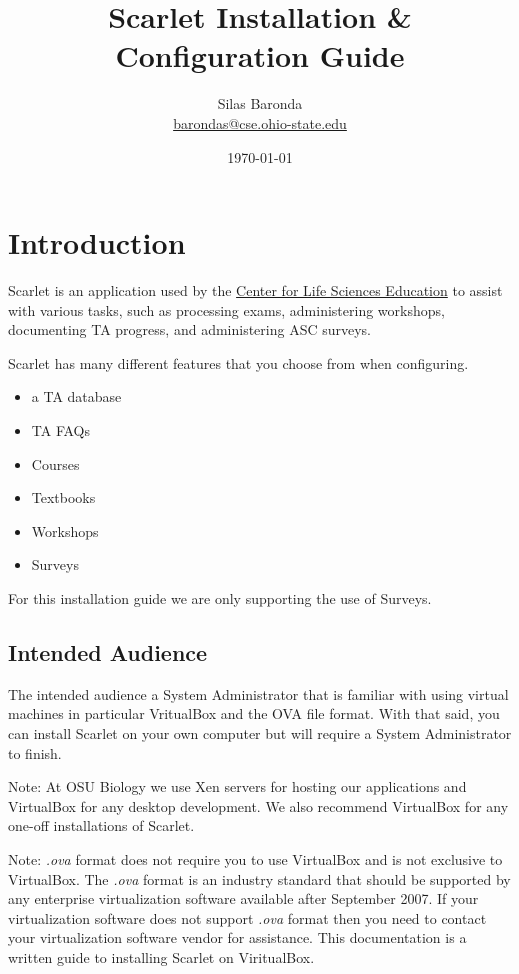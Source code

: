 \documentclass[pdftex,11pt,letterpaper]{article}
\begin{document}
\title{Scarlet Installation \& Configuration Guide}
\author{Silas Baronda\\\href{mailto:barondas@cse.ohio-state.edu}{barondas@cse.ohio-state.edu}}

\date{\today}
\maketitle

\tableofcontents
\newpage

\listoffigures
\newpage

\section{Introduction}

Scarlet is an application used by the \href{http://biology.osu.edu/}{Center for Life Sciences Education} to assist with various tasks, such as processing exams, administering workshops, documenting TA progress, and administering ASC surveys.

Scarlet has many different features that you choose from when configuring.

\begin{itemize}
\item a TA database
\item TA FAQs
\item Courses
\item Textbooks
\item Workshops
\item Surveys
\end{itemize}

For this installation guide we are only supporting the use of Surveys.

\subsection{Intended Audience}

The intended audience a System Administrator that is familiar with using virtual machines in particular VritualBox and the OVA file format.  With that said, you can install Scarlet on your own computer but will require a System Administrator to finish.

Note:
At OSU Biology we use Xen servers for hosting our applications and VirtualBox for any desktop development.  We also recommend VirtualBox for any one-off installations of Scarlet.

Note:
\textit{.ova} format does not require you to use VirtualBox and is not exclusive to VirtualBox.  The \textit{.ova} format is an industry standard that should be supported by any enterprise virtualization software available after September 2007.  If your virtualization software does not support \textit{.ova} format then you need to contact your virtualization software vendor for assistance.  This documentation is a written guide to installing Scarlet on ViritualBox.
\end{document}

